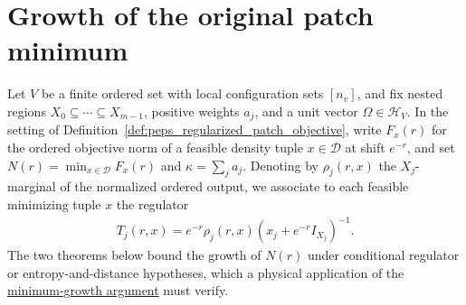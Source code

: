\section{Growth of the original patch minimum}
\label{sec:peps_actual_patch_minimum_growth}

Let $V$ be a finite ordered set with local configuration sets $[n_v]$, and fix
nested regions $X_0\subseteq\cdots\subseteq X_{m-1}$, positive weights $a_j$,
and a unit vector $\Omega\in\mathcal H_V$. In the setting of
Definition~\ref{def:peps_regularized_patch_objective}, write $F_x(r)$ for the
ordered objective norm of a feasible density tuple $x\in\mathcal D$ at shift
$e^{-r}$, and set $N(r)=\min_{x\in\mathcal D}F_x(r)$ and $\kappa=\sum_j a_j$.
Denoting by $\rho_j(r,x)$ the $X_j$-marginal of the normalized ordered output,
we associate to each feasible minimizing tuple $x$ the regulator
\begin{align*}
    T_j(r,x)=e^{-r}\rho_j(r,x)(x_j+e^{-r}I_{X_j})^{-1}.
\end{align*}
The two theorems below bound the growth of $N(r)$ under conditional regulator
or entropy-and-distance hypotheses, which a physical application of the
\href{https://github.com/openai/math/blob/adc7f1241b42e322a6451854ab7e4b4c146bf78a/preprints/Polynomial-PEPS-approximation-of-gapped-square-grid-ground-states-September-24-2026/build/sections/03-patches.tex\#L453-L481}{minimum-growth argument}
must verify.

